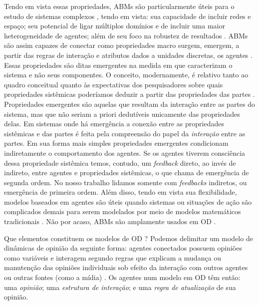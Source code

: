   Tendo em vista essas propriedades, ABMs são particularmente úteis para o
  estudo de sistemas complexos \cite{wilensky2015introduction}, tendo em vista:
  sua capacidade de incluir redes e espaço; seu potencial de ligar múltiplos
  domínios e de incluir uma maior heterogeneidade de agentes; além de seu foco
  na robustez de resultados \cite{de2014agent,wilensky2015introduction}. ABMs
  são assim capazes de conectar como propriedades macro surgem, emergem, a
  partir das regras de interação e atributos dados a unidades discretas, os
  agentes \cite{north2007managing}. Essas propriedades são ditas emergentes na
  medida em que caracterizam o sistema e não seus componentes. O conceito,
  modernamente, é relativo tanto ao quadro conceitual quanto às expectativas dos
  pesquisadores sobre quais propriedades sistêmicas poderíamos deduzir a partir
  das propriedades das partes \cite{epstein2006generative}. Propriedades
  emergentes são aquelas que resultam da interação entre as partes do sistema,
  mas que não seriam a priori dedutíveis unicamente das propriedades delas. Em
  sistemas onde há emergência a conexão entre as propriedades sistêmicas e das
  partes é feita pela compreensão do papel da \textit{interação} entre as
  partes. Em sua forma mais simples propriedades emergentes condicionam
  indiretamente o comportamento dos agentes. Se os agentes tiverem consciência
  dessa propriedade sistêmica temos, contudo, um \textit{feedback} direto, ao
  invés de indireto, entre agentes e propriedades sistêmicas, o que
   chama de emergência de segunda ordem. No nosso
  trabalho lidamos somente com \textit{feedbacks} indiretos, ou emergência de
  primeira ordem. Além disso, tendo em vista sua flexibilidade, modelos baseados
  em agentes são úteis quando sistemas ou situações de ação são complicados
  demais para serem modelados por meio de modelos matemáticos tradicionais
  \cite{kollman2003computational}. Não por acaso, ABMs são amplamente usados em
  OD \cite{castellano2012social,flache2017}.

  
  Que elementos constituem os modelos de OD ? Podemos delimitar um modelo de
  dinâmicas de opinião da seguinte forma: agentes conectados possuem opiniões
  como variáveis e interagem segundo regras que explicam a mudança ou manutenção
  das opiniões individuais sob efeito da interação com outros agentes ou outras
  fontes (como a mídia) \cite{sirbu2017opinion}. Os agentes num modelo em OD têm
  então: uma \textit{opinião}; uma \textit{estrutura de interação}; e uma
  \textit{regra de atualização} de sua opinião.

